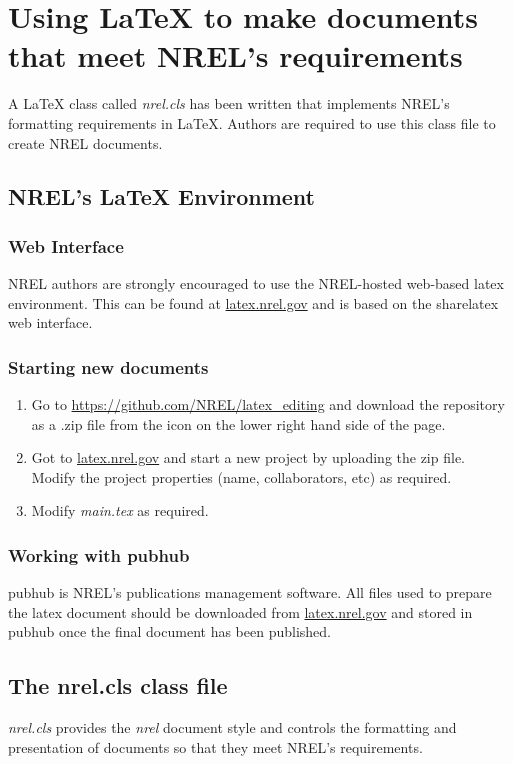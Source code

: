 \chapter{Using LaTeX to make documents that meet NREL's requirements}

A LaTeX class called \emph{nrel.cls} has been written that implements NREL's formatting requirements in LaTeX. Authors are required to use this class file to create NREL documents.

\section{NREL's LaTeX Environment}
\subsection{Web Interface}
NREL authors are strongly encouraged to use the NREL-hosted web-based latex environment. This can be found at \href{latex.nrel.gov}{latex.nrel.gov} and is based on the sharelatex web interface.

\subsection{Starting new documents}
\begin{enumerate}
\item Go to \href{https://github.com/NREL/latex_editing}{https://github.com/NREL/latex\_editing} and download the repository as a .zip file from the icon on the lower right hand side of the page.
\item Got to \href{latex.nrel.gov}{latex.nrel.gov} and start a new project by uploading the zip file. Modify the project properties (name, collaborators, etc) as required.
\item Modify \emph{main.tex} as required.
\end{enumerate}

\subsection{Working with pubhub}
pubhub is NREL's publications management software. All files used to prepare the latex document should be downloaded from \href{latex.nrel.gov}{latex.nrel.gov} and stored in pubhub once the final document has been published.

\section{The nrel.cls class file}\label{sec:nrelcls}
\emph{nrel.cls} provides the \emph{nrel} document style and controls the formatting and presentation of documents so that they meet NREL's requirements.

